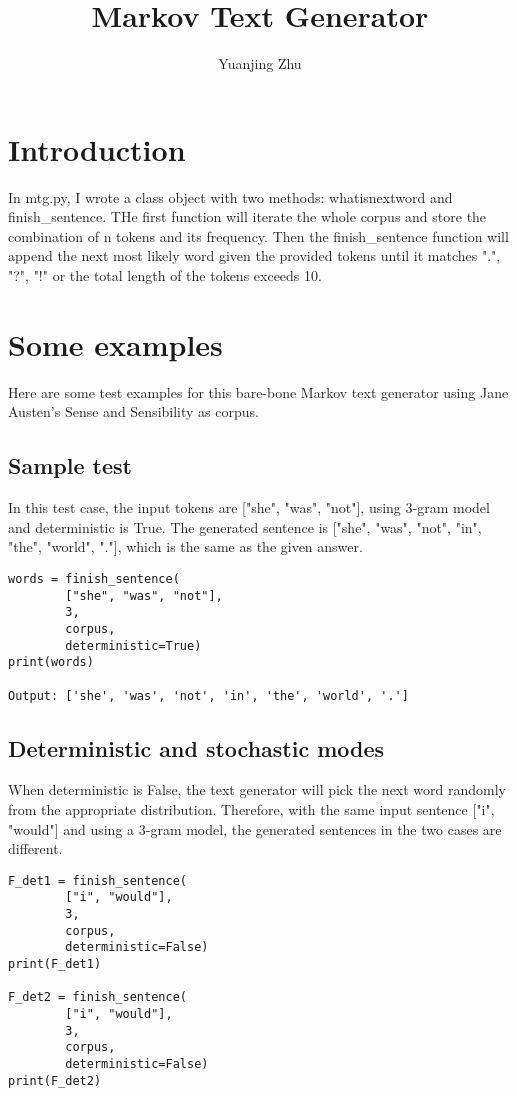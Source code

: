 \documentclass{article}
\title{Markov Text Generator}
\author{Yuanjing Zhu}
\begin{document}
\maketitle

\section{Introduction}

In mtg.py, I wrote a class object with two methods: whatisnextword and finish\_sentence. THe first function will iterate the whole corpus and store the combination of n tokens and its frequency. Then the finish\_sentence function will append the next most likely word given the provided tokens until it matches ".", "?", "!" or the total length of the tokens exceeds 10. 

\section{Some examples}
Here are some test examples for this bare-bone Markov text generator using Jane Austen's Sense and Sensibility as corpus.
\subsection{Sample test}
In this test case, the input tokens are ["she", "was", "not"], using 3-gram model and deterministic is True. The generated sentence is ["she", "was", "not", "in", "the", "world", "."], which is the same as the given answer.

\lstset{
basicstyle=\ttfamily,
frame=single
}
\begin{lstlisting}
words = finish_sentence(
        ["she", "was", "not"],
        3,
        corpus,
        deterministic=True)
print(words)

Output: ['she', 'was', 'not', 'in', 'the', 'world', '.']
\end{lstlisting}

\subsection{Deterministic and stochastic modes}

When deterministic is False, the text generator will pick the next word randomly from the appropriate distribution. Therefore, with the same input sentence ["i", "would"] and using a 3-gram model, the generated sentences in the two cases are different. 

\lstset{
basicstyle=\ttfamily,
frame=single
}
\begin{lstlisting}
F_det1 = finish_sentence(
        ["i", "would"],
        3,
        corpus,
        deterministic=False)
print(F_det1)

F_det2 = finish_sentence(
        ["i", "would"],
        3,
        corpus,
        deterministic=False)
print(F_det2)
\end{lstlisting}
\end{document}
